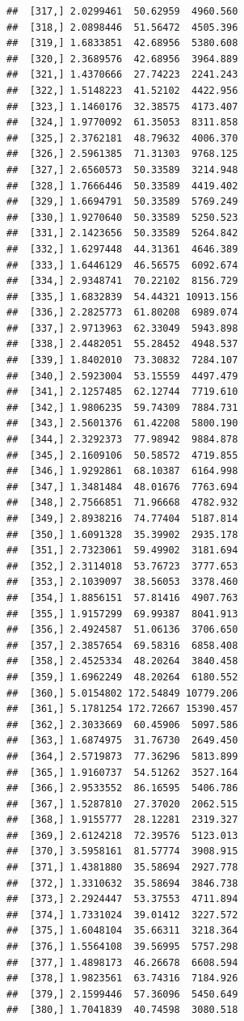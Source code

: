\documentclass[article]{jss}\usepackage[]{graphicx}\usepackage[]{xcolor}
\makeatletter
\newenvironment{kframe}{%
 \def\at@end@of@kframe{}%
 \ifinner\ifhmode%
  \def\at@end@of@kframe{\end{minipage}}%
  \begin{minipage}{\columnwidth}%
 \fi\fi%
 \def\FrameCommand##1{\hskip\@totalleftmargin \hskip-\fboxsep
 \colorbox{shadecolor}{##1}\hskip-\fboxsep
     \hskip-\linewidth \hskip-\@totalleftmargin \hskip\columnwidth}%
 \MakeFramed {\advance\hsize-\width
   \@totalleftmargin\z@ \linewidth\hsize
   \@setminipage}}%
 {\par\unskip\endMakeFramed%
 \at@end@of@kframe}
\newenvironment{knitrout}{}{} %
\makeatother
\begin{document}
\begin{knitrout}
\begin{kframe}
\begin{verbatim}
##  [317,] 2.0299461  50.62959  4960.560
##  [318,] 2.0898446  51.56472  4505.396
##  [319,] 1.6833851  42.68956  5380.608
##  [320,] 2.3689576  42.68956  3964.889
##  [321,] 1.4370666  27.74223  2241.243
##  [322,] 1.5148223  41.52102  4422.956
##  [323,] 1.1460176  32.38575  4173.407
##  [324,] 1.9770092  61.35053  8311.858
##  [325,] 2.3762181  48.79632  4006.370
##  [326,] 2.5961385  71.31303  9768.125
##  [327,] 2.6560573  50.33589  3214.948
##  [328,] 1.7666446  50.33589  4419.402
##  [329,] 1.6694791  50.33589  5769.249
##  [330,] 1.9270640  50.33589  5250.523
##  [331,] 2.1423656  50.33589  5264.842
##  [332,] 1.6297448  44.31361  4646.389
##  [333,] 1.6446129  46.56575  6092.674
##  [334,] 2.9348741  70.22102  8156.729
##  [335,] 1.6832839  54.44321 10913.156
##  [336,] 2.2825773  61.80208  6989.074
##  [337,] 2.9713963  62.33049  5943.898
##  [338,] 2.4482051  55.28452  4948.537
##  [339,] 1.8402010  73.30832  7284.107
##  [340,] 2.5923004  53.15559  4497.479
##  [341,] 2.1257485  62.12744  7719.610
##  [342,] 1.9806235  59.74309  7884.731
##  [343,] 2.5601376  61.42208  5800.190
##  [344,] 2.3292373  77.98942  9884.878
##  [345,] 2.1609106  50.58572  4719.855
##  [346,] 1.9292861  68.10387  6164.998
##  [347,] 1.3481484  48.01676  7763.694
##  [348,] 2.7566851  71.96668  4782.932
##  [349,] 2.8938216  74.77404  5187.814
##  [350,] 1.6091328  35.39902  2935.178
##  [351,] 2.7323061  59.49902  3181.694
##  [352,] 2.3114018  53.76723  3777.653
##  [353,] 2.1039097  38.56053  3378.460
##  [354,] 1.8856151  57.81416  4907.763
##  [355,] 1.9157299  69.99387  8041.913
##  [356,] 2.4924587  51.06136  3706.650
##  [357,] 2.3857654  69.58316  6858.408
##  [358,] 2.4525334  48.20264  3840.458
##  [359,] 1.6962249  48.20264  6180.552
##  [360,] 5.0154802 172.54849 10779.206
##  [361,] 5.1781254 172.72667 15390.457
##  [362,] 2.3033669  60.45906  5097.586
##  [363,] 1.6874975  31.76730  2649.450
##  [364,] 2.5719873  77.36296  5813.899
##  [365,] 1.9160737  54.51262  3527.164
##  [366,] 2.9533552  86.16595  5406.786
##  [367,] 1.5287810  27.37020  2062.515
##  [368,] 1.9155777  28.12281  2319.327
##  [369,] 2.6124218  72.39576  5123.013
##  [370,] 3.5958161  81.57774  3908.915
##  [371,] 1.4381880  35.58694  2927.778
##  [372,] 1.3310632  35.58694  3846.738
##  [373,] 2.2924447  53.37553  4711.894
##  [374,] 1.7331024  39.01412  3227.572
##  [375,] 1.6048104  35.66311  3218.364
##  [376,] 1.5564108  39.56995  5757.298
##  [377,] 1.4898173  46.26678  6608.594
##  [378,] 1.9823561  63.74316  7184.926
##  [379,] 2.1599446  57.36096  5450.649
##  [380,] 1.7041839  40.74598  3080.518

\end{verbatim}
\end{kframe}
\end{knitrout}
\end{document}
